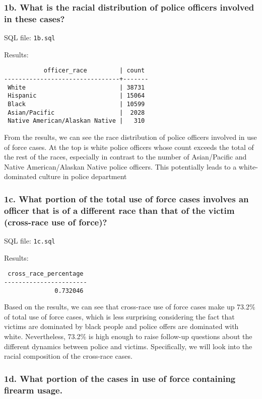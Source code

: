 \documentclass[10pt]{article}
\begin{document}
\subsubsection*{1b. What is the racial distribution of police officers involved in these cases?}

SQL file: \texttt{1b.sql}

Results:

\begin{verbatim}
           officer_race         | count
--------------------------------+-------
 White                          | 38731
 Hispanic                       | 15064
 Black                          | 10599
 Asian/Pacific                  |  2028
 Native American/Alaskan Native |   310
\end{verbatim}

From the results, we can see the race distribution of police officers involved in use of force cases. At the top is white police officers whose count exceeds the total of the rest of the races, especially in contrast to the number of Asian/Pacific and Native American/Alaskan Native police officers. This potentially leads to a white-dominated culture in police department


\subsubsection*{1c. What portion of the total use of force cases involves an officer that is of a different race than that of the victim (cross-race use of force)?}

SQL file: \texttt{1c.sql}

Results:

\begin{verbatim}
 cross_race_percentage
-----------------------
              0.732046
\end{verbatim}

Based on the results, we can see that cross-race use of force cases make up 73.2\% of total use of force cases, which is less surprising considering the fact that victims are dominated by black people and police offers are dominated with white. Nevertheless, 73.2\% is high enough to raise follow-up questions about the different dynamics between police and victims. Specifically, we will look into the racial composition of the cross-race cases.


\subsubsection*{1d. What portion of the cases in use of force containing firearm usage.}
\end{document}
